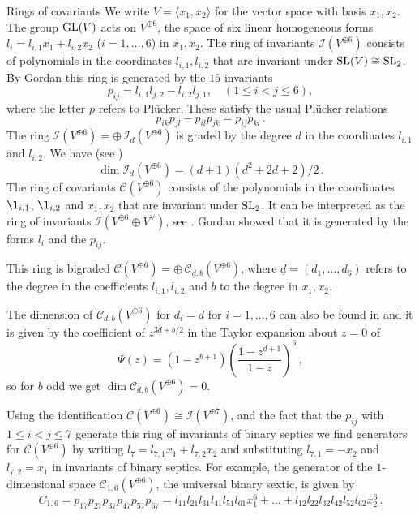 \documentclass[12pt]{amsart}
\numberwithin{equation}{section}
\def\leq{\leqslant}
\numberwithin{equation}{section}
\theoremstyle{definition}
\theoremstyle{remark}
\begin{document}
\begin{section}{Rings of covariants}
We write $V=\langle x_1,x_2\rangle$ for the vector space with basis $x_1,x_2$. The group ${\rm GL}(V)$
acts on $V^{\oplus 6}$, the space of six linear homogeneous forms $l_i=l_{i,1}x_1+l_{i,2}x_2$ ($i=1,\ldots,6$) 
in $x_1,x_2$. The ring of invariants $\mathcal{I}(V^{\oplus 6})$ consists of polynomials in the coordinates
$l_{i,1},l_{i,2}$ that are invariant under ${\rm SL}(V)\cong {\rm SL}_2$. By Gordan \cite{Gordan} this ring is generated
by the $15$ invariants 
$$
p_{ij}=l_{i,1}l_{j,2}-l_{i,2}l_{j,1}, \quad (1\leq i< j \leq 6),
$$ where the letter $p$ refers to Pl\"ucker. These satisfy the usual Pl\"ucker relations
$$
p_{ik}p_{jl}-p_{il}p_{jk}=p_{ij}p_{kl} \, .
$$
The ring $\mathcal{I}(V^{\oplus 6})=\oplus\,  \mathcal{I}_d(V^{\oplus 6})$ 
is graded by the degree $d$ in the coordinates $l_{i,1}$ and $l_{i,2}$.
We have (see \cite{Geyer})
$$
\dim \mathcal{I}_d(V^{\oplus 6})= (d+1)(d^2+2d+2)/2 \, .
$$
The ring of covariants $\mathcal{C}(V^{\oplus 6})$ consists of the polynomials
in the coordinates $\l_{i,1}$, $\l_{i,2}$ and $x_1,x_2$ that are invariant under ${\rm SL}_2$. 
It can be interpreted as the ring of invariants $\mathcal{I}(V^{\oplus 6} \oplus V^{\vee})$, 
see \cite[page 55]{Springer}. Gordan showed that it is generated by the forms
$l_i$ and the $p_{ij}$.

This ring is bigraded 
$\mathcal{C}(V^{\oplus 6})=\oplus\, \mathcal{C}_{\underline{d},b}(V^{\oplus 6})$,
where $\underline{d}=(d_1,\ldots,d_6)$ refers to the degree in the 
coefficients $l_{i,1},l_{i,2}$ and $b$ to the degree in $x_1,x_2$.

The dimension of $\mathcal{C}_{d,b}(V^{\oplus 6})$ for $d_i=d$ for $i=1,\ldots,6$ 
can also be found in \cite[p. 57]{Geyer} and it is given by
the coefficient of $z^{3d+b/2}$ in the Taylor expansion about $z=0$ of
\[
\Psi(z)=(1-z^{b+1})\left(\frac{1-z^{d+1}}{1-z}\right)^6\, ,
\]
so for $b$ odd we get $\dim \mathcal{C}_{d,b}(V^{\oplus 6})=0$.

Using the identification $\mathcal{C}(V^{\oplus 6})\cong \mathcal{I}(V^{\oplus 7})$,
and the fact that the $p_{ij}$ with $1 \leq i < j \leq 7$ generate this ring of
invariants of binary septics we find generators for $\mathcal{C}(V^{\oplus 6})$
by writing $l_7=l_{7,1}x_1+l_{7,2}x_2$ and substituting $l_{7,1}=-x_2$ and $l_{7,2}=x_1$
in invariants of binary septics.
For example, the generator of the $1$-dimensional space $\mathcal{C}_{1,6}(V^{\oplus 6})$, the
universal binary sextic, is given by
\[
C_{1,6}=p_{17}p_{27}p_{37}p_{47}p_{57}p_{67}
=l_{11} l_{21} l_{31} l_{41} l_{51} l_{61} x_1^{6}+\ldots+l_{12} l_{22} l_{32} l_{42} l_{52} l_{62} x_2^{6}\, .
\]


\end{section}
\end{document}
